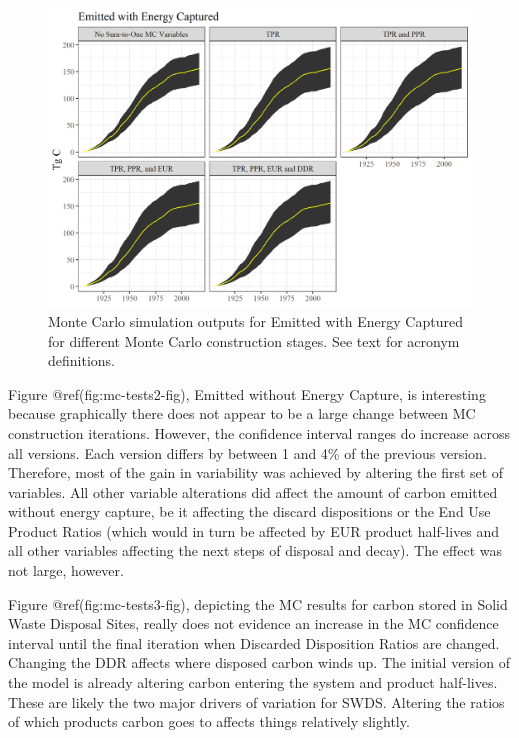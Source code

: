 \documentclass[
  openany]{book}
\begin{document}
\begin{figure}
\includegraphics[width=1\linewidth]{images/MC_tests} \caption{Monte Carlo simulation outputs for Emitted with Energy Captured for different Monte Carlo construction stages.  See text for acronym definitions.}\label{fig:mc-tests-fig}
\end{figure}

Figure @ref(fig:mc-tests2-fig), Emitted without Energy Capture, is
interesting because graphically there does not appear to be a large
change between MC construction iterations. However, the confidence
interval ranges do increase across all versions. Each version differs by
between 1 and 4\% of the previous version. Therefore, most of the gain
in variability was achieved by altering the first set of variables. All
other variable alterations did affect the amount of carbon emitted
without energy capture, be it affecting the discard dispositions or the
End Use Product Ratios (which would in turn be affected by EUR product
half-lives and all other variables affecting the next steps of disposal
and decay). The effect was not large, however.

Figure @ref(fig:mc-tests3-fig), depicting the MC results for carbon
stored in Solid Waste Disposal Sites, really does not evidence an
increase in the MC confidence interval until the final iteration when
Discarded Disposition Ratios are changed. Changing the DDR affects where
disposed carbon winds up. The initial version of the model is already
altering carbon entering the system and product half-lives. These are
likely the two major drivers of variation for SWDS. Altering the ratios
of which products carbon goes to affects things relatively slightly.
\end{document}
